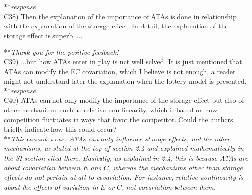 \documentclass[letterpaper,11pt]{article}
\begin{document}
\noindent ***\emph{response} \\
%

\noindent C38) Then the explanation of the importance of ATAs is done in relationship with the explanation of the storage effect. In detail, the explanation of the storage effect is superb, ...

\noindent ***\emph{Thank you for the positive feedback!} \\

\noindent C39) ...but how ATAs enter in play is not well solved. It is just mentioned that ATAs can modify the EC covariation, which I believe is not enough, a reader might not understand later the explanation when the lottery model is presented. \\

\noindent ***\emph{response} \\

\noindent C40) ATAs can not only modify the importance of the storage effect but also of other mechanisms such as relative non-linearity, which is based on how competition fluctuates in ways that favor the competitor. Could the authors briefly indicate how this could occur? \\

\noindent ***\emph{This cannot occur. ATAs can only influence storage effects, not the other mechanisms, as stated at
the top of section 2.4 and explained mathematically in the SI section cited there. Basically, as explained in 2.4, 
this is because ATAs are about covariation between $E$ and $C$, whereas the mechanisms other than storage effects
do not pertain at all to covariation. For instance, relative nonlinearity is about the effects of variation 
in $E$ or $C$, not covariation between them.} \\
\end{document}
